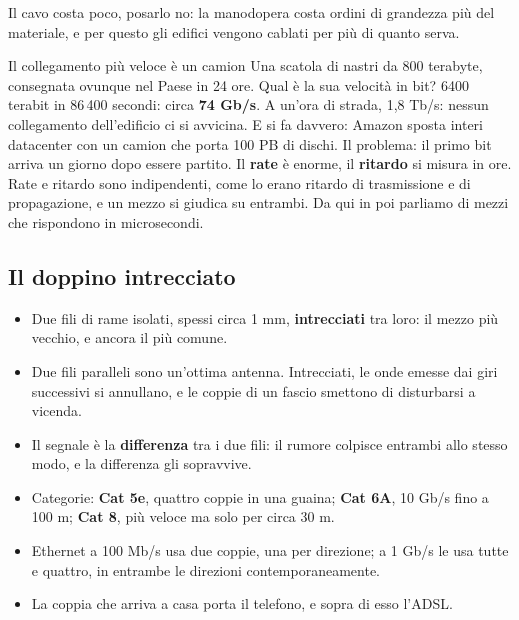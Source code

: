
Il cavo costa poco, posarlo no: la manodopera costa ordini di grandezza più del materiale, e per questo gli edifici vengono cablati
per più di quanto serva.

\begin{esempio}{Il collegamento più veloce è un camion}
Una scatola di nastri da 800 terabyte, consegnata ovunque nel Paese in 24 ore. Qual è la sua velocità in bit? 6400 terabit in 86\,400
secondi: circa \textbf{74 Gb/s}. A un'ora di strada, 1,8 Tb/s: nessun collegamento dell'edificio ci si avvicina. E si fa davvero:
Amazon sposta interi datacenter con un camion che porta 100 PB di dischi. Il problema: il primo bit arriva un giorno dopo essere
partito. Il \textbf{rate} è enorme, il \textbf{ritardo} si misura in ore. Rate e ritardo sono indipendenti, come lo erano ritardo di
trasmissione e di propagazione, e un mezzo si giudica su entrambi. Da qui in poi parliamo di mezzi che rispondono in microsecondi.
\end{esempio}

\subsection{Il doppino intrecciato}

\begin{itemize}
    \item Due fili di rame isolati, spessi circa 1 mm, \textbf{intrecciati} tra loro: il mezzo più vecchio, e ancora il più comune.
    \item Due fili paralleli sono un'ottima antenna. Intrecciati, le onde emesse dai giri successivi si annullano, e le coppie di un
          fascio smettono di disturbarsi a vicenda.
    \item Il segnale è la \textbf{differenza} tra i due fili: il rumore colpisce entrambi allo stesso modo, e la differenza gli
          sopravvive.
    \item Categorie: \textbf{Cat 5e}, quattro coppie in una guaina; \textbf{Cat 6A}, 10 Gb/s fino a 100 m; \textbf{Cat 8}, più veloce
          ma solo per circa 30 m.
    \item Ethernet a 100 Mb/s usa due coppie, una per direzione; a 1 Gb/s le usa tutte e quattro, in entrambe le direzioni
          contemporaneamente.
    \item La coppia che arriva a casa porta il telefono, e sopra di esso l'ADSL.
\end{itemize}

